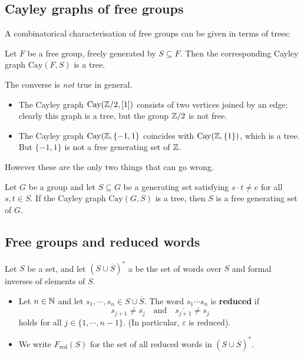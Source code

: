 \subsection{Cayley graphs of free groups}
A combinatorical characterisation of free groups can be given in terms of trees:
\begin{theorem}
    Let $F$ be a free group, freely generated by $S \subseteq F$. Then the corresponding Cayley graph $\mathrm{Cay}(F,S)$ is a tree.
\end{theorem}
\begin{example}
The converse is \emph{not} true in general.
\begin{itemize}
\setlength\itemsep{-.2em}
    \item The Cayley graph $\mathrm{Cay}(\mathbb{Z}/2, [1])$ consists of two vertices joined by an edge; clearly this graph is a tree, but the group $\mathbb{Z} /2$ is not free.
    \item The Cayley graph $\mathrm{Cay}(\mathbb{Z}, \{-1,1\} $ coincides with $\mathrm{Cay}(\mathbb{Z},\{1\} )$, which is a tree. But $\{-1,1\} $ is not a free generating set of $\mathbb{Z}$.
\end{itemize}    
However these are the only two things that can go wrong.
\end{example}
\begin{theorem}
    Let $G$ be a group and let $S \subseteq G$ be a generating set satisfying $s \cdot t \neq e$ for all $s,t \in S$. If the Cayley graph $\mathrm{Cay}(G,S)$ is a tree, then $S$ is a free generating set of $G$.
\end{theorem}

\subsection{Free groups and reduced words}
\begin{definition}[]
    Let $S$ be a set, and let $(S \cup \overline{S})^*$ a be the set of words over $S$ and formal inverses of elements of $S$.
    \begin{itemize}
    \setlength\itemsep{-.2em}
        \item Let $n \in \mathbb{N}$ and let $s_1, \cdots ,s_n  \in S \cup \overline{S}$. The word $s_1\cdots s_n $ is \textbf{reduced} if \[
        s _{j+1}\neq \overline{s_j } \quad \text{and} \quad \overline{s_{j+1}}\neq s_j 
    \] holds for all $j \in \{1,\cdots ,n-1\} $. (In particular, $\varepsilon $ is reduced).
\item We write $F_{\mathrm{red}}(S)$ for the set of all reduced words in $(S \cup \overline{S})^*$.
    \end{itemize}
\end{definition}

